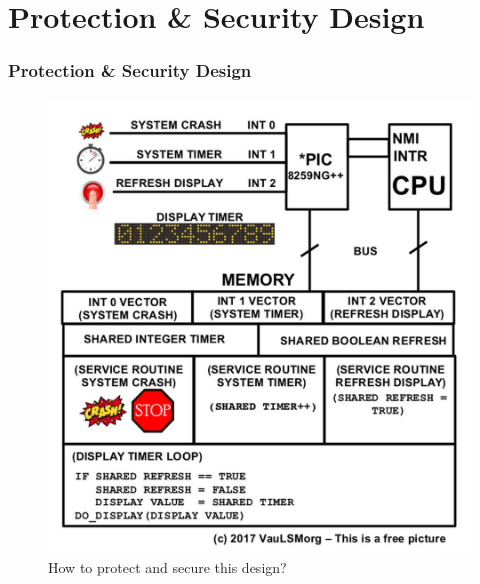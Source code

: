 \documentclass[xcolor=table, notheorems, hyperref={pdfpagelabels=false}]{beamer}
\begin{document}
\section{Protection \& Security Design}
\begin{frame}[fragile]
\frametitle{Protection \& Security Design}

\begin{figure}
\includegraphics[width=0.56\linewidth]{os00-int-protection}
\caption{How to protect and secure this design?}
\end{figure}

\end{frame}

\end{document}
